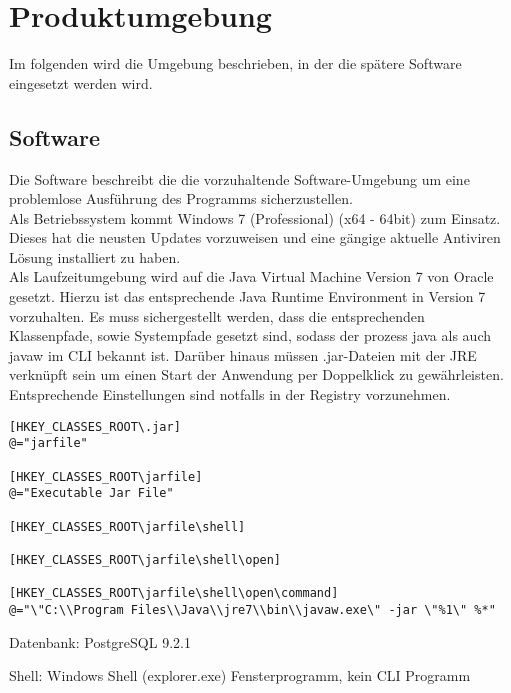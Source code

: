 \section{Produktumgebung}
\label{sec:Produktumgebung}

Im folgenden wird die Umgebung beschrieben, in der die spätere Software eingesetzt werden wird.

\subsection{Software}

Die Software beschreibt die die vorzuhaltende Software-Umgebung um eine problemlose Ausführung des Programms sicherzustellen.\\


Als Betriebssystem kommt Windows 7 (Professional) (x64 - 64bit) zum Einsatz. Dieses hat die neusten Updates vorzuweisen und eine gängige aktuelle Antiviren Lösung installiert zu haben.\\


Als Laufzeitumgebung wird auf die Java Virtual Machine Version 7 von Oracle gesetzt.
Hierzu ist das entsprechende Java Runtime Environment in Version 7 vorzuhalten. Es muss sichergestellt werden, dass die entsprechenden Klassenpfade, sowie Systempfade gesetzt sind, sodass der prozess java als auch javaw im CLI bekannt ist. Darüber hinaus müssen .jar-Dateien mit der JRE verknüpft sein um einen Start der Anwendung per Doppelklick zu gewährleisten. Entsprechende Einstellungen sind notfalls in der Registry vorzunehmen.\\


\begin{lstlisting}
[HKEY_CLASSES_ROOT\.jar]
@="jarfile"

[HKEY_CLASSES_ROOT\jarfile]
@="Executable Jar File"

[HKEY_CLASSES_ROOT\jarfile\shell]

[HKEY_CLASSES_ROOT\jarfile\shell\open]

[HKEY_CLASSES_ROOT\jarfile\shell\open\command]
@="\"C:\\Program Files\\Java\\jre7\\bin\\javaw.exe\" -jar \"%1\" %*"
\end{lstlisting}

Datenbank: PostgreSQL 9.2.1


Shell: Windows Shell (explorer.exe) Fensterprogramm, kein CLI Programm


